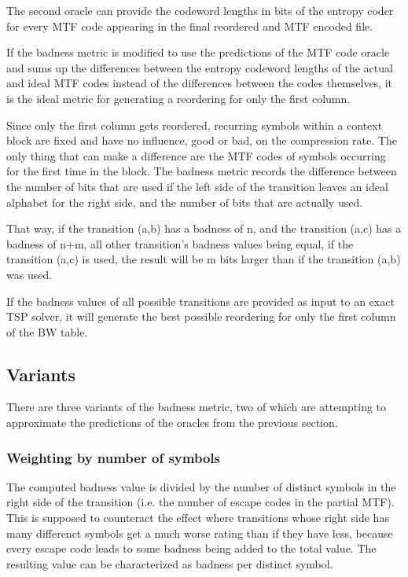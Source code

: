 \documentclass[a4paper]{scrreprt}
\begin{document}
The second oracle can provide the codeword lengths in bits of the entropy coder
for every MTF code appearing in the final reordered and MTF encoded file.

If the badness metric is modified to use the predictions of the MTF code oracle
and sums up the differences between the entropy codeword lengths of the actual
and ideal MTF codes instead of the differences between the codes themselves, it
is the ideal metric for generating a reordering for only the first column.

Since only the first column gets reordered, recurring symbols within a
context block are fixed and have no influence, good or bad, on the compression
rate. The only thing that can make a difference are the MTF codes of symbols
occurring for the first time in the block. The badness metric records the
difference between the number of bits that are used if the left side of the
transition leaves an ideal alphabet for the right side, and the number of bits
that are actually used.

That way, if the transition (a,b) has a badness of n, and the transition (a,c)
has a badness of n+m, all other transition's badness values being equal, if the
transition (a,c) is used, the result will be m bits larger than if the
transition (a,b) was used.

If the badness values of all possible transitions are provided as input to an
exact TSP solver, it will generate the best possible reordering for only the
first column of the BW table.

\subsection{Variants}

There are three variants of the badness metric, two of which are attempting to
approximate the predictions of the oracles from the previous section.

\subsubsection{Weighting by number of symbols}

The computed badness value is divided by the number of distinct symbols in the
right side of the transition (i.e. the number of escape codes in the partial
MTF). This is supposed to counteract the effect where transitions whose right
side has many differenct symbols get a much worse rating than if they have less,
because every escape code leads to some badness being added to the total value.
The resulting value can be characterized as badness per distinct symbol.
\end{document}
